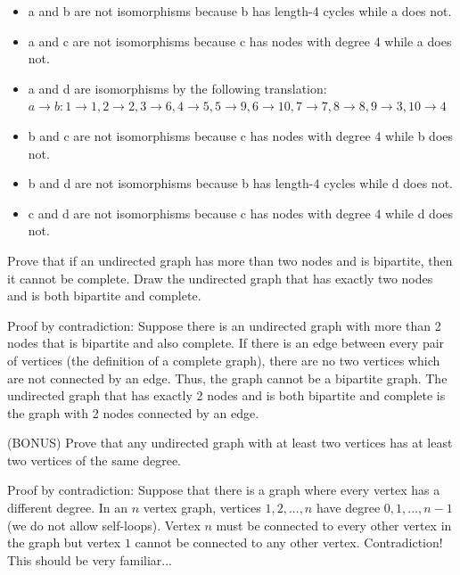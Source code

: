 \documentclass[solution, letterpaper]{cs20inclass}
\begin{document}
\solution
\begin{itemize}
\item[] a and b are not isomorphisms because b has length-4 cycles while a does not.
\item[] a and c are not isomorphisms because c has nodes with degree 4 while a does not.
\item[] a and d are isomorphisms by the following translation: $a \rightarrow b: 1 \rightarrow 1, 2 \rightarrow 2, 3 \rightarrow 6, 4 \rightarrow 5, 5 \rightarrow 9, 6 \rightarrow 10, 7 \rightarrow 7, 8 \rightarrow 8, 9 \rightarrow 3, 10 \rightarrow 4$
\item[] b and c are not isomorphisms because c has nodes with degree 4 while b does not.
\item[] b and d are not isomorphisms because b has length-4 cycles while d does not.
\item[] c and d are not isomorphisms because c has nodes with degree 4 while d does not.
\end{itemize}

\problem Prove that if an undirected graph has more than two nodes and is bipartite, then it cannot be complete. Draw the undirected graph that has exactly two nodes and is both bipartite and complete.

\solution Proof by contradiction: Suppose there is an undirected graph with more than 2 nodes that is bipartite and also complete. If there is an edge between every pair of vertices (the definition of a complete graph), there are no two vertices which are not connected by an edge. Thus, the graph cannot be a bipartite graph. The undirected graph that has exactly 2 nodes and is both bipartite and complete is the graph with 2 nodes connected by an edge.

\problem (BONUS) Prove that any undirected graph with at least two vertices has at least two vertices of the same degree.

\begin{solution} Proof by contradiction: Suppose that there is a graph where every vertex has a different degree. In an $n$ vertex graph, vertices $1, 2, ..., n$ have degree $0, 1, ..., n-1$ (we do not allow self-loops). Vertex $n$ must be connected to every other vertex in the graph but vertex $1$ cannot be connected to any other vertex. Contradiction! This should be very familiar...
\end{solution}
\end{document}
